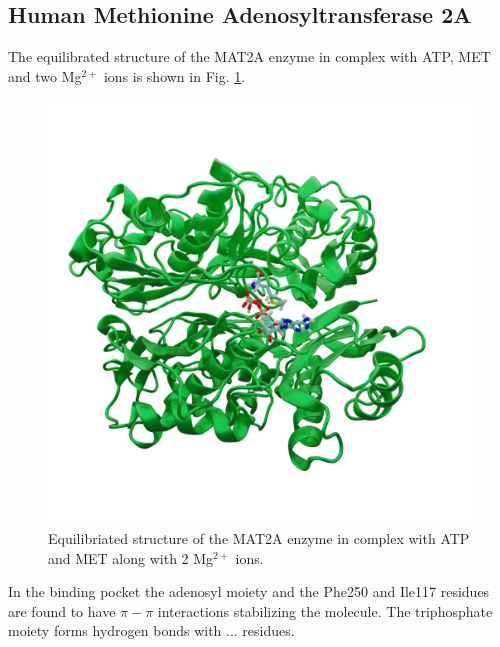 \documentclass[journal=jpcbfk,manuscript=article,layout=traditional]{achemso}
\begin{document}
\subsection{Human Methionine Adenosyltransferase 2A}
The equilibrated structure of the MAT2A enzyme in complex with 
ATP, MET and two Mg$^{2+}$ ions is shown in Fig. \ref{fig:mat2a-equil}.
\begin{figure}[ht!]
\centering
\includegraphics[scale=0.2]{figures/mat2a-equil.png}
\caption{Equilibriated structure of the MAT2A enzyme in complex with ATP and 
MET along with 2 Mg$^{2+}$ ions.}
\label{fig:mat2a-equil}
\end{figure}
In the binding pocket the adenosyl moiety and the Phe250 and Ile117 residues 
are found to have $\pi-\pi$ interactions stabilizing the molecule. The triphosphate 
moiety forms hydrogen bonds with ... residues. 
\end{document}
